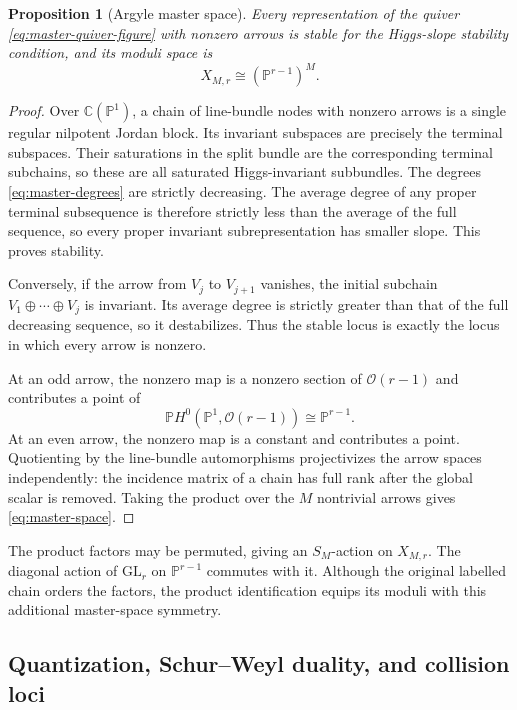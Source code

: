 \documentclass[11pt]{article}
\newtheorem{proposition}[theorem]{Proposition}
\theoremstyle{definition}
\theoremstyle{remark}
\newcommand{\C}{\mathbb C}
\newcommand{\Pp}{\mathbb P}
\newcommand{\cO}{\mathcal O}
\begin{document}
\begin{proposition}[Argyle master space]\label{prop:argyle-master-space}
Every representation of the quiver \eqref{eq:master-quiver-figure} with nonzero arrows is stable for the Higgs-slope stability condition, and its moduli space is
\begin{equation}\label{eq:master-space}
 X_{M,r}\cong(\Pp^{r-1})^M.
\end{equation}
\end{proposition}

\begin{proof}
Over $\C(\Pp^1)$, a chain of line-bundle nodes with nonzero arrows is a single regular nilpotent Jordan block.  Its invariant subspaces are precisely the terminal subspaces.  Their saturations in the split bundle are the corresponding terminal subchains, so these are all saturated Higgs-invariant subbundles.  The degrees \eqref{eq:master-degrees} are strictly decreasing.  The average degree of any proper terminal subsequence is therefore strictly less than the average of the full sequence, so every proper invariant subrepresentation has smaller slope.  This proves stability.

Conversely, if the arrow from $V_j$ to $V_{j+1}$ vanishes, the initial subchain $V_1\oplus\cdots\oplus V_j$ is invariant.  Its average degree is strictly greater than that of the full decreasing sequence, so it destabilizes.  Thus the stable locus is exactly the locus in which every arrow is nonzero.

At an odd arrow, the nonzero map is a nonzero section of $\cO(r-1)$ and contributes a point of
\[
 \Pp H^0(\Pp^1,\cO(r-1))\cong\Pp^{r-1}.
\]
At an even arrow, the nonzero map is a constant and contributes a point.  Quotienting by the line-bundle automorphisms projectivizes the arrow spaces independently: the incidence matrix of a chain has full rank after the global scalar is removed.  Taking the product over the $M$ nontrivial arrows gives \eqref{eq:master-space}.
\end{proof}

The product factors may be permuted, giving an $S_M$-action on $X_{M,r}$.  The diagonal action of $\mathrm{GL}_r$ on $\Pp^{r-1}$ commutes with it.  Although the original labelled chain orders the factors, the product identification equips its moduli with this additional master-space symmetry.

\subsection{Quantization, Schur--Weyl duality, and collision loci}
\end{document}
